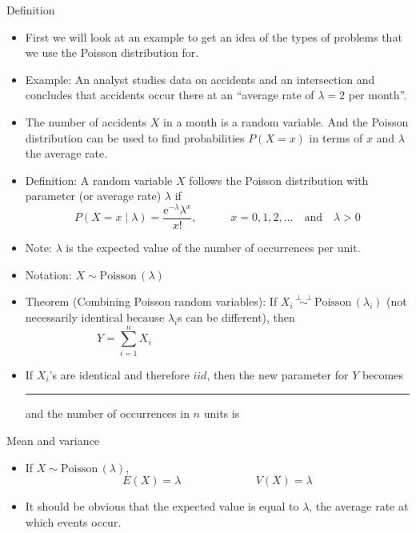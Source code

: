 \documentclass{article}
\newcommand{\blankul}[1]{\rule[-1.5mm]{#1}{0.15mm}}	%
\newcommand{\follow}[1]{\sim \text{#1}\,}		%
\newcommand{\followsp}[2]{\overset{#1}\sim \text{#2}\,}		%
\newcommand{\ind}{\perp \!\!\! \perp}		%
\newcommand{\e}{\mathrm{e}}		%
\begin{document}
Definition\bigskip
\begin{itemize}
    \item First we will look at an example to get an idea of the types of problems that we use the Poisson distribution for.
    \item Example: An analyst studies data on accidents and an intersection and concludes that accidents occur there at an ``average rate of $\lambda = 2$ per month''.
    \item[] The number of accidents $X$ in a month is a random variable. And the Poisson distribution can be used to find probabilities $P(X = x)$ in terms of $x$ and $\lambda$ the average rate.\bigskip
    \item Definition: A random variable $X$ follows the Poisson distribution with parameter (or average rate) $\lambda$ if
    \[P(X = x \mid \lambda) = \frac{\e^{-\lambda} \lambda^x }{x!}, \quad\quad\quad x = 0, 1, 2, \ldots \quad \text{and} \quad \lambda > 0\]
    \item[] Note: $\lambda$ is the expected value of the number of occurrences per unit.
    \item Notation: $X \follow{Poisson}(\lambda)$\bigskip
    \item Theorem (Combining Poisson random variables): If $X_i \followsp{\ind}{Poisson}(\lambda_i)$ (not necessarily identical because $\lambda_i$s can be different), then
    \[Y = \sum_{i = 1}^n X_i\hspace{200pt}\]\vspace{50pt}
    \item[] If $X_i$'s are identical and therefore $iid$, then the new parameter for $Y$ becomes \blankul{1cm} and the number of occurrences in $n$ units is\vspace{50pt}
\end{itemize}\bigskip

Mean and variance\bigskip
\begin{itemize}
    \item If $X \follow{Poisson}(\lambda)$,
    \[E(X) = \lambda \hspace{80pt} V(X) = \lambda\]
    \item It should be obvious that the expected value is equal to $\lambda$, the average rate at which events occur.
\end{itemize}\bigskip

\newpage%
\end{document}
